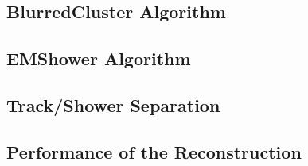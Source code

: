 \subsection{BlurredCluster Algorithm}\label{sec:BlurredCluster}

\subsection{EMShower Algorithm}\label{sec:EMShower}

\subsection{Track/Shower Separation}\label{sec:TrackShowerSeparation}

\subsection{Performance of the Reconstruction}\label{sec:ReconstructionPerformance}
